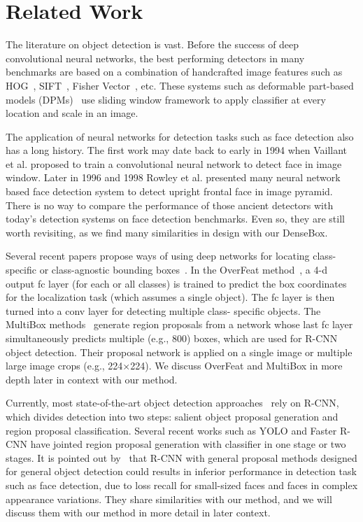 \section{Related Work}

The literature on object detection is vast. Before the success of deep convolutional neural networks, the best performing detectors in many benchmarks are based on a combination of handcrafted image features such as HOG~\cite{dalal2005histograms}, SIFT~\cite{lowe2004distinctive}, Fisher Vector~\cite{cinbis2013segmentation}, etc. These systems such as deformable part-based models (DPMs)~\cite{felzenszwalb2010object} use sliding window framework to apply classifier at every location and scale in an image.

The application of neural networks for detection tasks such as face detection also has a long history. The first work may date back to early in 1994 when Vaillant et al.\cite{vaillant1994original} proposed to train a convolutional neural network to detect face in image window. Later in 1996 and 1998 Rowley et al.\cite{rowley1998neural,rowley1998rotation} presented many neural network based face detection system to detect upright frontal face in image pyramid. There is no way to compare the performance of those ancient detectors with today’s detection systems on face detection benchmarks. Even so, they are still worth revisiting, as we find many similarities in design with our DenseBox. 

Several recent papers propose ways of using deep networks for locating class-specific or class-agnostic bounding boxes~\cite{sermanet2013overfeat, erhan2014scalable, YOLO}. In the OverFeat method~\cite{sermanet2013overfeat}, a 4-d output fc layer (for each or all classes) is trained to predict the box coordinates for the localization task (which assumes a single object). The fc layer is then turned into a conv layer for detecting multiple class- specific objects. The MultiBox methods~\cite{erhan2014scalable} generate region proposals from a network whose last fc layer simultaneously predicts multiple (e.g., 800) boxes, which are used for R-CNN~\cite{girshick2014rich} object detection. Their proposal network is applied on a single image or multiple large image crops (e.g., 224×224). We discuss OverFeat and MultiBox in more depth later in context with our method.

Currently, most state-of-the-art object detection approaches~\cite{ouyang2014deepid, li2015convolutional, erhan2014scalable,girshick2015fast} rely on R-CNN, which divides detection into two steps: salient object proposal generation and region proposal classification. Several recent works such as YOLO and Faster R-CNN have jointed region proposal generation with classifier in one stage or two stages. It is pointed out by~\cite{farfade2015multi} that R-CNN with general proposal methods designed for general object detection could results in inferior performance in detection task such as face detection, due to loss recall for small-sized faces and faces in complex appearance variations. They share similarities with our method, and we will discuss them with our method in more detail in later context.  

